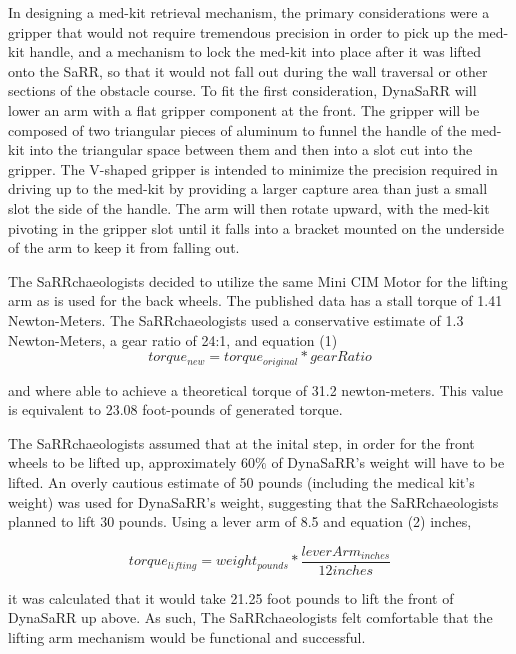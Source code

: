 \documentclass[12pt]{article}
\begin{document}
In designing a med-kit retrieval mechanism, the primary considerations were a gripper that would not require tremendous precision in order to pick up the med-kit handle, and a mechanism to lock the med-kit into place after it was lifted onto the SaRR, so that it would not fall out during the wall traversal or other sections of the obstacle course. To fit the first consideration, DynaSaRR will lower an arm with a flat gripper component at the front. The gripper will be composed of two triangular pieces of aluminum to funnel the handle of the med-kit into the triangular space between them and then into a slot cut into the gripper. The V-shaped gripper is intended to minimize the precision required in driving up to the med-kit by providing a larger capture area than just a small slot the side of the handle. The arm will then rotate upward, with the med-kit pivoting in the gripper slot until it falls into a bracket mounted on the underside of the arm to keep it from falling out.

The SaRRchaeologists decided to utilize the same Mini CIM Motor for the lifting arm as is used for the back wheels. The published data has a stall torque of 1.41 Newton-Meters. The SaRRchaeologists used a conservative estimate of 1.3 Newton-Meters, a gear ratio of 24:1, and equation (1) 
\begin{equation}
    torque_{new} = torque_{original} * gearRatio
\end{equation}

and where able to achieve a theoretical torque of 31.2 newton-meters. This value is equivalent to 23.08 foot-pounds of generated torque. 

The SaRRchaeologists assumed that at the inital step, in order for the front wheels to be lifted up, approximately $60\%$ of DynaSaRR's weight will have to be lifted. An overly cautious estimate of 50 pounds (including the medical kit's weight) was used for DynaSaRR's weight, suggesting that the SaRRchaeologists planned to lift 30 pounds. Using a lever arm of 8.5 and equation (2) inches, 

\begin{equation}
    torque_{lifting} = weight_{pounds} * \frac{leverArm_{inches}}{12 inches}
\end{equation}

it was calculated that it would take 21.25 foot pounds to lift the front of DynaSaRR up above. As such, The SaRRchaeologists felt comfortable that the lifting arm mechanism would be functional and successful. 
\end{document}
